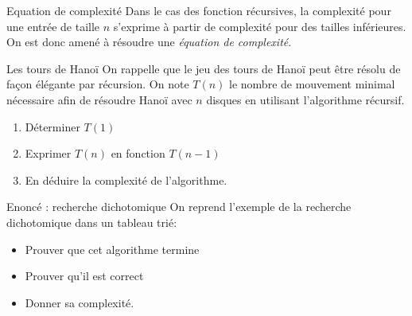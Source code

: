 \documentclass[10pt]{beamer}
\begin{document}
\begin{frame}[fragile]{\Ctitle}{\stitle}
    \begin{block}{Equation de complexité}
        Dans le cas des fonction récursives, la complexité pour une entrée de taille $n$ s'exprime à partir de complexité pour des tailles inférieures. On est donc amené à résoudre une \textit{équation de complexité}.
    \end{block}
\end{frame}

\begin{frame}[fragile]{\Ctitle}{\stitle}
    \begin{exampleblock}{Les tours de Hanoï}
        On rappelle que le jeu des tours de Hanoï peut être résolu de façon élégante par récursion. On note $T(n)$ le nombre de mouvement minimal nécessaire afin de résoudre Hanoï avec $n$ disques en utilisant l'algorithme récursif.
        \begin{enumerate}
            \item Déterminer $T(1)$
            \item Exprimer $T(n)$ en fonction $T(n-1)$
            \item En déduire la complexité de l'algorithme.
        \end{enumerate}
    \end{exampleblock}
\end{frame}



\begin{frame}[fragile]{\Ctitle}{\stitle}
    \begin{exampleblock}{Enoncé : recherche dichotomique}
    On reprend l'exemple de la recherche dichotomique dans un tableau trié:
    \begin{itemize}
        \item<2-> Prouver que cet algorithme termine
        \item<3-> Prouver qu'il est correct
        \item<4-> Donner sa complexité.
    \end{itemize}
\end{exampleblock}
\end{frame}
\end{document}
